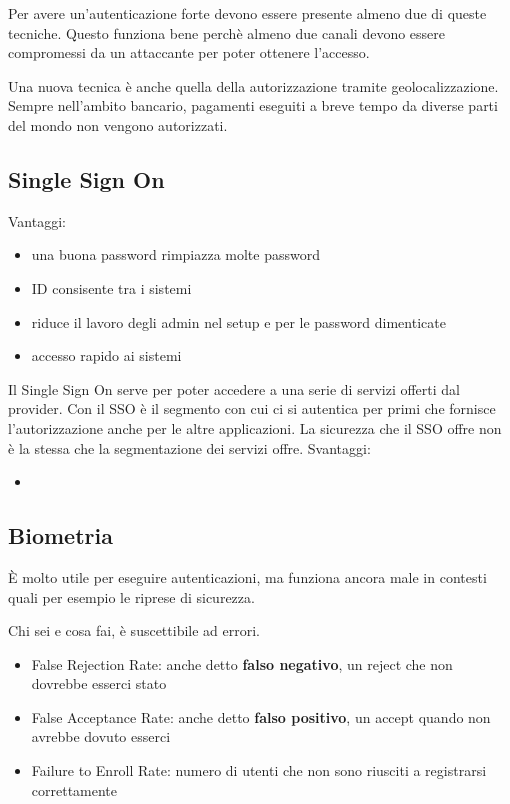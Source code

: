 Per avere un'autenticazione forte devono essere presente almeno due di queste
tecniche. Questo funziona bene perchè almeno due canali devono essere
compromessi da un attaccante per poter ottenere l'accesso.

Una nuova tecnica è anche quella della autorizzazione tramite
geolocalizzazione. Sempre nell'ambito bancario, pagamenti eseguiti a breve
tempo da diverse parti del mondo non vengono autorizzati.

\subsection{Single Sign On}

Vantaggi:
\begin{itemize}
\item una buona password rimpiazza molte password
\item ID consisente tra i sistemi
\item riduce il lavoro degli admin nel setup e per le password dimenticate
\item accesso rapido ai sistemi
\end{itemize}


Il Single Sign On serve per poter accedere a una serie di servizi offerti dal
provider. Con il SSO è il segmento con cui ci si autentica per primi che
fornisce l'autorizzazione anche per le altre applicazioni.
La sicurezza che il SSO offre non è la stessa che la segmentazione dei servizi
offre.
Svantaggi:
\begin{itemize}
\item %
\end{itemize}


\subsection{Biometria}

È molto utile per eseguire autenticazioni, ma funziona ancora male in contesti
quali per esempio le riprese di sicurezza.

Chi sei e cosa fai, è suscettibile ad errori.

\begin{itemize}
\item False Rejection Rate: anche detto \textbf{falso negativo}, un reject che
non dovrebbe esserci stato
\item False Acceptance Rate: anche detto \textbf{falso positivo}, un accept
quando non avrebbe dovuto esserci
\item Failure to Enroll Rate: numero di utenti che non sono riusciti a
registrarsi correttamente
\end{itemize}

